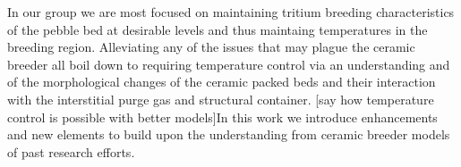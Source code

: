 In our group we are most focused on maintaining tritium breeding characteristics of the pebble bed at desirable levels and thus maintaing temperatures in the breeding region. Alleviating any of the issues that may plague the ceramic breeder all boil down to requiring temperature control via an understanding and of the morphological changes of the ceramic packed beds and their interaction with the interstitial purge gas and structural container. [say how temperature control is possible with better models]In this work we introduce enhancements and new elements to build upon the understanding from ceramic breeder models of past research efforts. 










